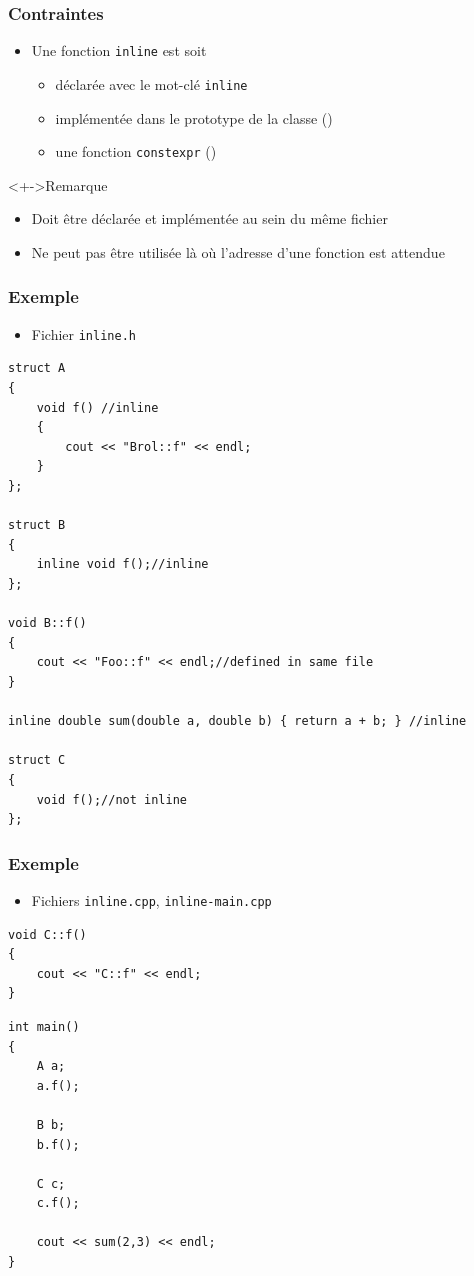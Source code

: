 \begin{frame}
\frametitle{Contraintes}
\begin{itemize}[<+->]
\item Une fonction \lstinline|inline| est soit
	\begin{itemize}
	\item déclarée avec le mot-clé \lstinline|inline|
	\item implémentée dans le prototype de la classe (\cpp)
	\item une fonction \lstinline|constexpr| (\cpp)
	\end{itemize}
\end{itemize}
\begin{alertblock}<+->{Remarque}
	\begin{itemize}[<+->]
	\item Doit être déclarée et implémentée au sein du même fichier
	\item Ne peut pas être utilisée là où l'adresse d'une fonction est attendue
	\end{itemize}
\end{alertblock}
\end{frame}

\begin{frame}[containsverbatim]
\frametitle{Exemple}
\begin{itemize}
\item Fichier \texttt{inline.h}
\end{itemize}
\begin{lstlisting}
struct A
{
	void f() //inline
	{
		cout << "Brol::f" << endl;
	}
};

struct B
{
	inline void f();//inline
};

void B::f()
{
	cout << "Foo::f" << endl;//defined in same file
}

inline double sum(double a, double b) { return a + b; } //inline

struct C
{
	void f();//not inline
};
\end{lstlisting}
\end{frame}

\begin{frame}[containsverbatim]
\frametitle{Exemple}
\begin{itemize}
\item Fichiers \texttt{inline.cpp}, \texttt{inline-main.cpp}
\end{itemize}
\begin{lstlisting}
void C::f()
{
	cout << "C::f" << endl;
}
\end{lstlisting}
\begin{lstlisting}
int main()
{
	A a;
	a.f();

	B b;
	b.f();

	C c;
	c.f();
	
	cout << sum(2,3) << endl;
}
\end{lstlisting}
\end{frame}

